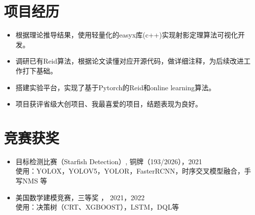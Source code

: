 \documentclass{resume}
\begin{document}
\section{项目经历}
\begin{itemize}
  \item 根据理论推导结果，使用轻量化的easyx库(c++)实现射影定理算法可视化开发。
\end{itemize}
\begin{itemize}
  \item 调研已有Reid算法，根据论文读懂对应开源代码，做详细注释，为后续改进工作打下基础。
  \item 搭建实验平台，实现了基于Pytorch的Reid和online learning算法。 
  \item 项目获评省级大创项目、我最喜爱的项目，结题表现为良好。
\end{itemize}


\section{竞赛获奖}
\begin{itemize}[parsep=0.2ex]
  \item 目标检测比赛（Starfish Detection）, 铜牌（193/2026），2021
  \\ \qquad 使用：YOLOX，YOLOV5，YOLOR，FasterRCNN，时序交叉模型融合，手写NMS 等
  \item 美国数学建模竞赛，三等奖 ， 2021，2022
  \\ \qquad 使用：决策树（CRT、XGBOOST），LSTM，DQL等
\end{itemize}

\end{document}
